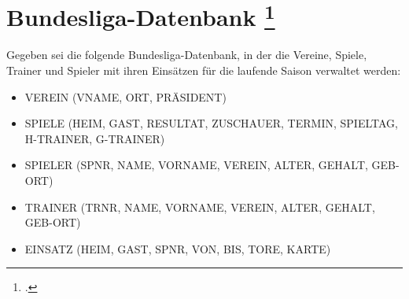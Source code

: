 \documentclass{bschlangaul-aufgabe}
\begin{document}

\section{Bundesliga-Datenbank
\footcite[Relationale Algebra und SQL, Aufgabe 4]{db:ab:7}}

Gegeben sei die folgende Bundesliga-Datenbank, in der die Vereine,
Spiele, Trainer und Spieler mit ihren Einsätzen für die laufende Saison
verwaltet werden:

\begin{itemize}
\item VEREIN (VNAME, ORT, PRÄSIDENT)
\item SPIELE (HEIM, GAST, RESULTAT, ZUSCHAUER, TERMIN, SPIELTAG, H-TRAINER,
G-TRAINER)
\item SPIELER (SPNR, NAME, VORNAME, VEREIN, ALTER, GEHALT, GEB-ORT)
\item TRAINER (TRNR, NAME, VORNAME, VEREIN, ALTER, GEHALT, GEB-ORT)
\item EINSATZ (HEIM, GAST, SPNR, VON, BIS, TORE, KARTE)
\end{itemize}
\end{document}
